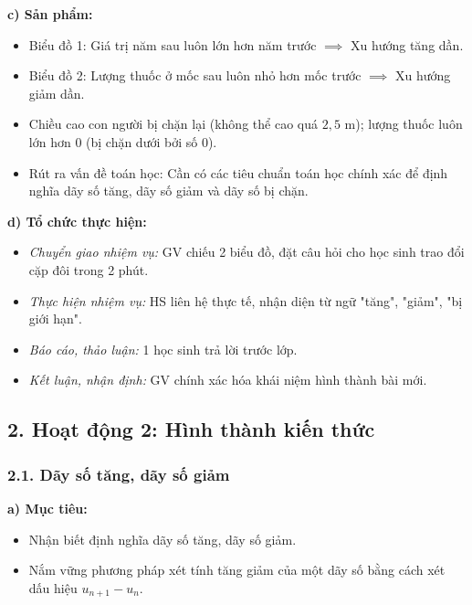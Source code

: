 \documentclass[12pt, a4paper]{article}
\begin{document}
\noindent \textbf{c) Sản phẩm:}  
\begin{itemize}[leftmargin=0.8cm]  
    \item Biểu đồ 1: Giá trị năm sau luôn lớn hơn năm trước $\implies$ Xu hướng tăng dần.  
    \item Biểu đồ 2: Lượng thuốc ở mốc sau luôn nhỏ hơn mốc trước $\implies$ Xu hướng giảm dần.  
    \item Chiều cao con người bị chặn lại (không thể cao quá $2{,}5\text{ m}$); lượng thuốc luôn lớn hơn $0$ (bị chặn dưới bởi số 0).  
    \item Rút ra vấn đề toán học: Cần có các tiêu chuẩn toán học chính xác để định nghĩa dãy số tăng, dãy số giảm và dãy số bị chặn.  
\end{itemize}  
  
\noindent \textbf{d) Tổ chức thực hiện:}  
\begin{itemize}[leftmargin=0.8cm]  
    \item \textit{Chuyển giao nhiệm vụ:} GV chiếu 2 biểu đồ, đặt câu hỏi cho học sinh trao đổi cặp đôi trong 2 phút.  
    \item \textit{Thực hiện nhiệm vụ:} HS liên hệ thực tế, nhận diện từ ngữ "tăng", "giảm", "bị giới hạn".  
    \item \textit{Báo cáo, thảo luận:} 1 học sinh trả lời trước lớp.  
    \item \textit{Kết luận, nhận định:} GV chính xác hóa khái niệm hình thành bài mới.  
\end{itemize}  
  
\subsection*{2. Hoạt động 2: Hình thành kiến thức}  
  
\subsubsection*{2.1. Dãy số tăng, dãy số giảm}  
  
\noindent \textbf{a) Mục tiêu:}  
\begin{itemize}[leftmargin=0.8cm]  
    \item Nhận biết định nghĩa dãy số tăng, dãy số giảm.  
    \item Nắm vững phương pháp xét tính tăng giảm của một dãy số bằng cách xét dấu hiệu $u_{n+1} - u_n$.  
\end{itemize}  
  
\end{document}
